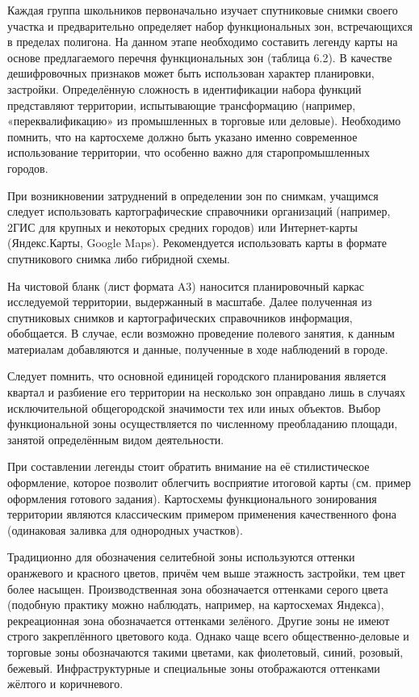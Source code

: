 \documentclass[
  11pt,
]{book}
\begin{document}
Каждая группа школьников первоначально изучает спутниковые снимки своего участка и предварительно определяет набор
функциональных зон, встречающихся в пределах полигона. На данном этапе необходимо составить легенду карты на основе предлагаемого перечня
функциональных зон (таблица 6.2). В качестве дешифровочных признаков может быть использован характер планировки,
застройки. Определённую сложность в идентификации набора функций представляют территории, испытывающие трансформацию (например, «переквалификацию» из промышленных в торговые или деловые). Необходимо помнить, что на картосхеме должно быть указано именно современное использование территории, что особенно важно для старопромышленных городов.

При возникновении затруднений в определении зон по снимкам, учащимся следует использовать картографические справочники
организаций (например, 2ГИС для крупных и некоторых средних городов) или Интернет-карты (Яндекс.Карты, Google Maps). Рекомендуется использовать карты в формате спутникового снимка либо гибридной схемы.

На чистовой бланк (лист формата A3) наносится планировочный каркас исследуемой территории, выдержанный в масштабе. Далее
полученная из спутниковых снимков и картографических справочников информация, обобщается. В случае, если возможно проведение полевого занятия, к данным материалам добавляются и данные, полученные в ходе наблюдений в городе.

Следует помнить, что основной единицей городского планирования является квартал и разбиение его территории на
несколько зон оправдано лишь в случаях исключительной общегородской значимости тех или иных объектов. Выбор функциональной зоны осуществляется по численному преобладанию площади, занятой определённым видом деятельности.

При составлении легенды стоит обратить внимание на её стилистическое оформление, которое позволит облегчить восприятие итоговой
карты (см. пример оформления готового задания). Картосхемы функционального зонирования территории являются классическим примером применения качественного фона (одинаковая заливка для однородных участков).

Традиционно для обозначения селитебной зоны используются оттенки оранжевого и красного цветов, причём чем выше этажность
застройки, тем цвет более насыщен. Производственная зона обозначается оттенками серого цвета (подобную практику можно наблюдать, например, на картосхемах Яндекса), рекреационная зона обозначается оттенками зелёного. Другие зоны не имеют строго закреплённого цветового кода. Однако чаще всего общественно-деловые и торговые зоны обозначаются такими цветами, как
фиолетовый, синий, розовый, бежевый. Инфраструктурные и специальные зоны отображаются оттенками жёлтого и коричневого.
\end{document}

